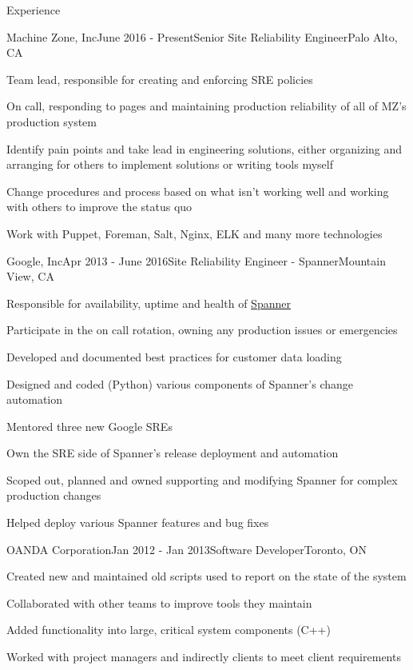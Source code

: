 \documentclass{resume}
\begin{document}
  \begin{rSection}{Experience}
    \begin{rSubsection}{Machine Zone, Inc}{June 2016 - Present}{Senior Site Reliability Engineer}{Palo Alto, CA}
      \item Team lead, responsible for creating and enforcing SRE policies
      \item On call, responding to pages and maintaining production reliability of all of MZ's production system
      \item Identify pain points and take lead in engineering solutions, either organizing and arranging for others to implement solutions or writing tools myself
      \item Change procedures and process based on what isn't working well and working with others to improve the status quo
      \item Work with Puppet, Foreman, Salt, Nginx, ELK and many more technologies
    \end{rSubsection}

    \begin{rSubsection}{Google, Inc}{Apr 2013 - June 2016}{Site Reliability Engineer - Spanner}{Mountain View, CA}
      \item Responsible for availability, uptime and health of \href{https://en.wikipedia.org/wiki/Spanner_(database)}{Spanner}
      \item Participate in the on call rotation, owning any production issues or emergencies
      \item Developed and documented best practices for customer data loading
      \item Designed and coded (Python) various components of Spanner's change automation
      \item Mentored three new Google SREs 
      \item Own the SRE side of Spanner's release deployment and automation
      \item Scoped out, planned and owned supporting and modifying Spanner for complex production changes
      \item Helped deploy various Spanner features and bug fixes
    \end{rSubsection}

    \begin{rSubsection}{OANDA Corporation}{Jan 2012 - Jan 2013}{Software Developer}{Toronto, ON}
      \item Created new and maintained old scripts used to report on the state of the system
      \item Collaborated with other teams to improve tools they maintain
      \item Added functionality into large, critical system components (C++)
      \item Worked with project managers and indirectly clients to meet client requirements
    \end{rSubsection}


\end{rSection}
\end{document}
